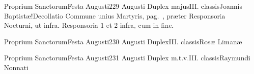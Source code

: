 \documentclass[liber-responsorialis_aestivus.tex]{subfiles}
\begin{document}
	{Proprium Sanctorum}{Festa Augusti}{2}{29 Augusti}
	{Duplex majus}{III. classis}{Joannis Baptistæ!Decollatio}
	{Commune unius Martyris, pag.\ \pageref{M-UMEX}, præter Responsoria  Nocturni, ut infra.}
	{Responsoria 1 et 2 infra, cum  in fine.}

	{Proprium Sanctorum}{Festa Augusti}{2}{30 Augusti}
	{Duplex}{III. classis}{Rosæ Limanæ}
	{\vnrubric}
	{\respdetemp}

	{Proprium Sanctorum}{Festa Augusti}{2}{31 Augusti}
	{Duplex m.t.v.}{III. classis}{Raymundi Nonnati}
	{\conprubric}
	{\respdetemp}
\end{document}
